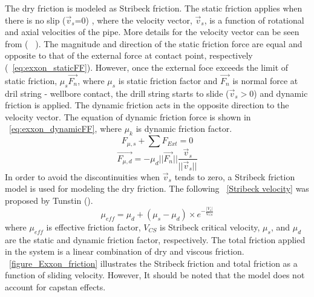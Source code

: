 The dry friction is modeled as Stribeck friction.  \resolvedcomment{}  The static friction applies when there is no slip ($\vec{v}_s$=0) , where the velocity vector, $\vec{v}_s$, is a function of rotational and axial velocities of the pipe. More details for the velocity vector can be seen from (~ \cite{ref:cayeux2018a}). The magnitude and direction of the static friction force are equal and opposite to that of the external force at contact point, respectively (\equationname~\ref{eq:exxon_staticFF}). However, once the external foce exceeds the limit of static friction, $\mu_s \vec{F_n}$, where $\mu_s$ is static friction factor and $\vec{F_n}$ is normal force at dril string - wellbore contact, the drill string starts to slide ($\vec{v}_s > 0$) and dynamic friction is applied. The dynamic friction acts in the opposite direction to the velocity vector. The equation of dynamic friction force is shown in \equationname~\ref{eq:exxon_dynamicFF}, where $\mu_k$ is dynamic friction factor.
\begin{equation}\label{eq:exxon_staticFF}
  F_{\mu,s} + \sum F_{Ext} = 0
\end{equation}
\begin{equation}\label{eq:exxon_dynamicFF}
  \vec{F_{\mu, d}} = -\mu_d ||{\vec{F_n}}||\frac{\vec{v}_s}{{||\vec{v}_s}||}
\end{equation}
In order to avoid the discontinuities when $\vec{v}_s$ tends to zero, a Stribeck friction model is used for modeling the dry friction.  The following \equationname~\ref{Stribeck velocity} was proposed by Tunstin (\cite{ref:tustin1947a}).
\begin{equation}\label{Stribeck velocity}
\mu_{eff} = \mu_{d} + (\mu_{s} - \mu_{d})\times e^{-\frac{|V_s|}{V_{CS}}}
\end{equation}
where $\mu_{eff}$ is effective friction factor, $V_{CS}$ is Stribeck critical velocity, $\mu_{s}$, and $\mu_{d}$ are the static and dynamic friction factor, respectively. The total friction applied in the system is a linear combination of dry and viscous friction. \figurename~\ref{figure_Exxon_friction} illustrates the Stribeck friction and total friction as a function of sliding velocity. However, It should be noted that the model does not account for capstan effects. \resolvedcomment{}
